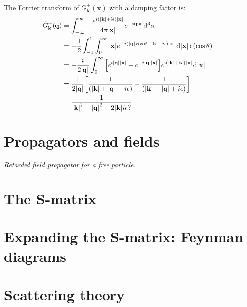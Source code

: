\documentclass{report}
\begin{document}
\begin{subquests}
\begin{subquests}
		\item The Fourier transform of $G^+_{\mathbf k}(\mathbf x)$ with a damping factor is:
		\begin{align*}
			\tilde G^+_{\mathbf k}(\vb q) & = \int_{-\infty}^{\infty} -\frac{e^{i\pqty{\abs{\mathbf k} + i\epsilon}\abs{\mathbf x}}}{4\pi\abs{\mathbf x}}e^{-i\vb q\cdot \vb x}\,\dd^3{\vb x} \\ 
			& = -\frac{1}{2}\int_{-1}^{1}\int_0^{\infty}{\abs{\mathbf x}e^{-i\pqty{\abs{\vb q}\cos\theta -\abs{\mathbf k} - i\epsilon}\abs{\mathbf x}}} \dd{\abs{\mathbf x}}\dd\pqty{\cos\theta} \\
			& = -\frac{i}{2\abs{\vb q}}\int_{0}^{\infty} \bqty{e^{i\abs{\vb q}\abs{\mathbf x}}- e^{-i\abs{\vb q}\abs{\mathbf x}}}e^{i\pqty{\abs{\mathbf k} + i\epsilon}\abs{\mathbf x}} \dd{\abs{\mathbf x}} \\
			& = \frac{1}{2\abs{\vb q}}\bqty{\frac{1}{\pqty{\abs{\vb k} + \abs{\vb q} + i\epsilon}}- \frac{1}{ \pqty{\abs{\vb k} - \abs{\vb q} + i\epsilon}}} \\ 
			& = \frac{1}{\abs{\vb k}^2 - \abs{\vb q}^2 + 2\abs{\vb k}i\epsilon?}
		\end{align*}
		\item
	\end{subquests}
\end{subquests}


\chapter{Propagators and fields}

\begin{subquests}
	\item \emph{Retarded field propagator for a free particle.}

\end{subquests}

\chapter{The S-matrix}

\chapter{Expanding the S-matrix: Feynman diagrams}

\chapter{Scattering theory}
\end{document}
